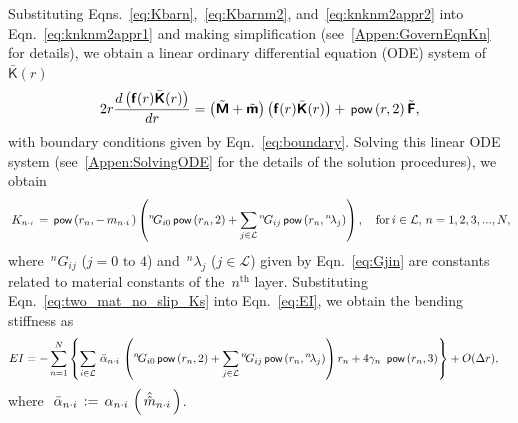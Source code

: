 \documentclass[preprint,12pt,times]{elsarticle}
\newcommand{\plus}[1]{\hat{#1}}
\newcommand{\plusplus}[1]{\plus{\plus{#1}}}
\numberwithin{equation}{section}
\renewcommand{\u}[1]{\boldsymbol{#1}}
\newcommand{\usf}[1]{\u{\mathsf #1}}
\newcommand{\busf}[1]{\bar{\usf{ #1}}}
\newcommand{\pr}[1]{\left( #1 \right)}
\newcommand{\p}{\,\textsf{\small pow}}
\newcommand{\msub}[2]{
\IfEqCase{#2}{
      {i}{\, m_{#1\cdot #2}\,}%
  }[\,m_{#1\cdot {\scriptscriptstyle #2}}\,]}
\newcommand{\msubpp}[2]{
\IfEqCase{#2}{
      {i}{\, \plusplus{m}_{#1\cdot #2}\,}%
  }[\,\plusplus{m}_{#1\cdot {\scriptscriptstyle #2}}\,]}
\newcommand{\alphasub}[2]{
\IfEqCase{#2}{
		{i}{\,\alpha_{ {#1}\cdot { \scriptstyle #2}}\,}%
	}[\,\alpha_{ {#1}\cdot {\scriptscriptstyle #2}}\,]}
\newcommand{\alphaBARsub}[2]{
\IfEqCase{#2}{
        {i}{\,\bar{\alpha}_{ {#1}\cdot { \scriptstyle #2}}\,}%
    }[\,\bar{\alpha}_{ {#1}\cdot {\scriptscriptstyle #2}}\,]}
\newcommand{\Ksub}[2]{\,K_{ {#1}\cdot {\scriptscriptstyle #2}}\,}
\renewcommand{\>}{$\Rightarrow$}
\begin{document}
Substituting Eqns.~\eqref{eq:Kbarn},~\eqref{eq:Kbarnm2}, and~\eqref{eq:knknm2appr2} into Eqn.~\eqref{eq:knknm2appr1} and making simplification (see~\ref{Appen:GovernEqnKn} for details), we obtain a linear ordinary differential equation (ODE) system of~$\busf{K}(r)$
\begin{equation}
  2 r \frac{d \pr{\usf{f}(r)\busf{K}(r)}}{dr} = \pr{\tilde{\usf{M}} + \tilde{\usf{m}}} \pr{\usf{f}(r)\busf{K}(r)} + \p\pr{r,2} \tilde{\usf{F}},
	\label{eq:GovernEqnKn}
\end{equation}
with boundary conditions given by Eqn.~\eqref{eq:boundary}. Solving this linear ODE system (see~\ref{Appen:SolvingODE} for the details of the solution procedures), we obtain
\begin{equation}
\Ksub{n}{i} = \p\pr{r_{n},-\msub{n}{i}} \left( {}^{n}\!G_{i0} \p\pr{r_{n},2} + \sum_{j \in \mathcal{L}} {}^{n}\!G_{ij} \p\pr{r_{n},{}^{n}\!\lambda_{j}} \right), \quad \text{for}\, i \in \mathcal{L},\,n = 1,2,3,...,N,
\label{eq:two_mat_no_slip_Ks}
\end{equation}
where~${}^{n}\!G_{ij}$ ($j = \text{0 to 4}$) and~${}^{n}\!\lambda_{j}$ ($j \in \mathcal{L}$) given by Eqn.~\eqref{eq:Gjin} are constants related to material constants of the~$n^{\text{th}}$ layer.
Substituting Eqn.~\eqref{eq:two_mat_no_slip_Ks} into Eqn.~\eqref{eq:EI}, we obtain the bending stiffness as
\begin{equation}
\begin{aligned}
	EI & = - \sum_{n=1}^{N} \left\lbrace \sum_{i \in \mathcal{L}} \alphaBARsub{n}{i} \left( {}^{n}\!G_{i0} \p\pr{r_{n},2} + \sum_{j \in \mathcal{L}} {}^{n}\!G_{ij} \p\pr{r_{n},{}^{n}\!\lambda_{j}} \right) r_{n} + 4\gamma_{n}~ \p\pr{r_{n},3} \right\rbrace + O(\Delta r) ,
\end{aligned}
\end{equation}
where~$\alphaBARsub{n}{i} := \alphasub{n}{i} \left( \msubpp{n}{i}\right)$.
\end{document}
